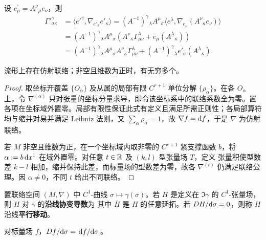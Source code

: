 \begin{theorem}\label{thm:connection-frame-change}
    设 $e_\mu^{\prime}=A^\nu{ }_\mu e_\nu$，则
    \begin{align*}
        \Gamma'^{\gamma}_{\sigma\kappa}&=\langle e'^\gamma,\nabla_{e'_\sigma} e'_\kappa\rangle=(A^{-1})^\gamma{}_\lambda A^\mu{}_\sigma\langle e^\lambda,\nabla_{e_\mu} (A^\nu{}_\kappa e_\nu)\rangle\\
    &=(A^{-1})^\gamma{}_\lambda A^\mu{}_\sigma(A^\nu{}_\kappa\Gamma^\lambda_{\mu\nu}+e_\mu(A^\lambda{}_\kappa))\\
    &=(A^{-1})^\gamma{}_\lambda A^\mu{}_\sigma A^\nu{}_\kappa\Gamma^\lambda_{\mu\nu}+(A^{-1})^\gamma{}_\lambda e'_\sigma(A^\lambda{}_\kappa).
    \end{align*}
\end{theorem}

\begin{theorem}
    流形上存在仿射联络；非空且维数为正时，有无穷多个。
\end{theorem}
\begin{proof}
    取坐标开覆盖 $\{O_\alpha\}$ 及从属的局部有限 $C^{r+1}$ 单位分解 $\{\rho_\alpha\}$。在各 $O_\alpha$ 上，令 $\nabla^{(\alpha)}$ 只对张量的坐标分量求导，即令该坐标系中的联络系数全为零。置
    各项在坐标域外置零。局部有限性保证此式有定义且满足所需正则性；各局部算符均与缩并对易并满足 Leibniz 法则，又 $\sum_\alpha\rho_\alpha=1$，故 $\nabla f=\dd f$，于是 $\nabla$ 为仿射联络。

    若 $M$ 非空且维数为正，在一个坐标域内取非零的 $C^{r+1}$ 紧支撑函数 $b$，将 $\alpha:=b\,\dd x^1$ 在域外置零。对任意 $t\in\mathbb{R}$ 及 $(k,l)$ 型张量场 $T$，定义
    张量积使型数差 $k-l$ 相加，缩并保持此差，而标量场的型数差为零，故各 $\nabla^{(t)}$ 仍满足联络公理。因 $\alpha\ne0$，不同 $t$ 给出不同联络。
\end{proof}


\begin{definition}
    置联络空间 $(M,\nabla)$ 中 $C^1$-曲线 $\sigma\mapsto\gamma(\sigma)$。若 $H$ 是定义在 $\Im\gamma$ 的 $C^1$-张量场，则 $H$ 对 $\gamma$ 的\textbf{沿线协变导数}为
其中 $\bar H$ 是 $H$ 的任意延拓。若 $D H/\dd\sigma=0$，则称 $H$ 沿线\textbf{平行移动}。
\end{definition}

\begin{example}
    对标量场 $f$，$D f/\dd\sigma=\dv*{f}{\sigma}$。
\end{example}

